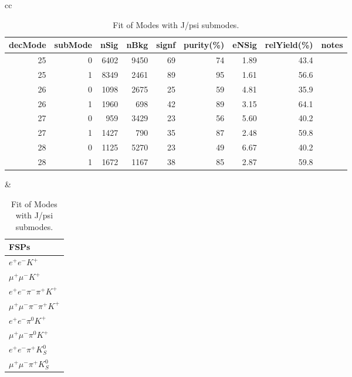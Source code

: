 \begin{table}[h!]
\begin{center}
\begin{tabular}{cc}

\begin{tabular}{|rrrrrrrrr|}
\hline
decMode &subMode&  nSig &  nBkg &  signf&  purity(\%)&eNSig & relYield(\%)  & notes \\
\hline
25      &  0    &  6402 &  9450 &  69   &  74       &  1.89 & 43.4          &       \\
25      &  1    &  8349 &  2461 &  89   &  95       &  1.61 & 56.6          &       \\
26      &  0    &  1098 &  2675 &  25   &  59       &  4.81 & 35.9          &       \\
26      &  1    &  1960 &  698  &  42   &  89       &  3.15 & 64.1          &       \\
27      &  0    &  959  &  3429 &  23   &  56       &  5.60 & 40.2          &       \\
27      &  1    &  1427 &  790  &  35   &  87       &  2.48 & 59.8          &       \\
28      &  0    &  1125 &  5270 &  23   &  49       &  6.67 & 40.2          &       \\
28      &  1    &  1672 &  1167 &  38   &  85       &  2.87 & 59.8          &       \\
\hline
\end{tabular}
&
\begin{tabular}{|l|}
\hline
FSPs\\
\hline
$e^+ e^- K^+ $ \\
$\mu^+ \mu^- K^+ $ \\
$e^+ e^- \pi^- \pi^+ K^+ $ \\
$\mu^+ \mu^- \pi^- \pi^+ K^+ $ \\
$e^+ e^- \pi^0 K^+ $ \\
$\mu^+ \mu^- \pi^0 K^+ $ \\
$e^+ e^- \pi^+ K_S^0 $ \\
$\mu^+ \mu^- \pi^+ K_S^0 $ \\
\hline
\end{tabular}
\\
\end{tabular}
\caption{Fit of Modes with J/psi submodes.}
\end{center}
\end{table}

